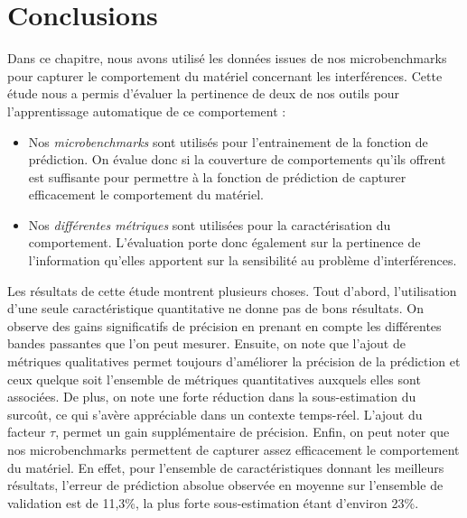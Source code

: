 \section{Conclusions}

Dans ce chapitre, nous avons utilisé les données issues de nos microbenchmarks pour capturer le comportement du matériel concernant les interférences.
Cette étude nous a permis d'évaluer la pertinence de deux de nos outils pour l'apprentissage automatique de ce comportement :
\begin{itemize}
	\item Nos \emph{microbenchmarks} sont utilisés pour l'entrainement de la fonction de prédiction.
	On évalue donc si la couverture de comportements qu'ils offrent est suffisante pour permettre à la fonction de prédiction de capturer efficacement le comportement du matériel.
	\item Nos \emph{différentes métriques} sont utilisées pour la caractérisation du comportement.
	L'évaluation porte donc également sur la pertinence de l'information qu'elles apportent sur la sensibilité au problème d'interférences.
\end{itemize}

Les résultats de cette étude montrent plusieurs choses.
Tout d'abord, l'utilisation d'une seule caractéristique quantitative ne donne pas de bons résultats.
On observe des gains significatifs de précision en prenant en compte les différentes bandes passantes que l'on peut mesurer.
Ensuite, on note que l'ajout de métriques qualitatives permet toujours d'améliorer la précision de la prédiction et ceux quelque soit l'ensemble de métriques quantitatives auxquels elles sont associées.
De plus, on note une forte réduction dans la sous-estimation du surcoût, ce qui s'avère appréciable dans un contexte temps-réel.
L'ajout du facteur $\tau$, permet un gain supplémentaire de précision.
Enfin, on peut noter que nos microbenchmarks permettent de capturer assez efficacement le comportement du matériel.
En effet, pour l'ensemble de caractéristiques donnant les meilleurs résultats, l'erreur de prédiction absolue  observée en moyenne sur l'ensemble de validation est de 11,3\%, la plus forte sous-estimation étant d'environ 23\%.

